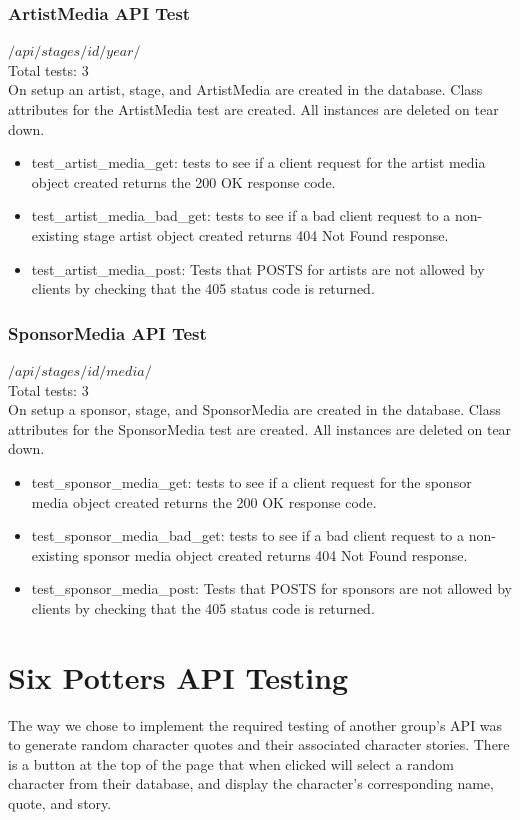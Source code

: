 \documentclass[12pt,english]{scrartcl}
\begin{document}
\subsubsection{ArtistMedia API Test}
$/api/stages/{id}/{year}/$ \\
Total tests: 3 \\
On setup an artist, stage, and ArtistMedia are created in the database. Class attributes for the ArtistMedia test are created.
All instances are deleted on tear down.
\begin{itemize}
\item test\_artist\_media\_get: tests to see if a client request for the artist media object created returns the 200 OK response code.
\item test\_artist\_media\_bad\_get: tests to see if a bad client request to a non-existing stage artist object created returns
404 Not Found response.
\item test\_artist\_media\_post: Tests that POSTS for artists are not allowed by clients by checking that the 405 status code is returned.
\end{itemize}

\subsubsection{SponsorMedia API Test}
$/api/stages/{id}/{media}/$ \\
Total tests: 3 \\
On setup a sponsor, stage, and SponsorMedia are created in the database. Class attributes for the SponsorMedia test are created.
All instances are deleted on tear down.
\begin{itemize}
\item test\_sponsor\_media\_get: tests to see if a client request for the sponsor media object created returns the 200 OK response code.
\item test\_sponsor\_media\_bad\_get: tests to see if a bad client request to a non-existing sponsor media object created returns
404 Not Found response.
\item test\_sponsor\_media\_post: Tests that POSTS for sponsors are not allowed by clients by checking that the 405 status code is returned.
\end{itemize}


\section{Six Potters API Testing}
The way we chose to implement the required testing of another group's API was to generate random character quotes and 
their associated character stories. There is a button at the top of the page that when clicked will select a random 
character from their database, and display the character's corresponding name, quote, and story.
\end{document}
